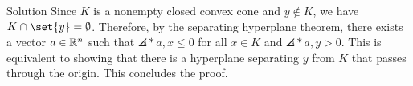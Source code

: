 \documentclass{article}
\begin{document}
\begin{solution}
    {Solution}
    Since $K$ is a nonempty closed convex cone and $y\notin K$, we have $K\cap\set{y}=\emptyset$. Therefore, by the separating hyperplane theorem, there exists a vector $a\in \mathbb{R}^n$ such that $\angles*{a,x}\leq 0$ for all $x\in K$ and $\angles*{a,y}>0$. This is equivalent to showing that there is a hyperplane separating $y$ from $K$ that passes through the origin. This concludes the proof.
\end{solution}
\end{document}
